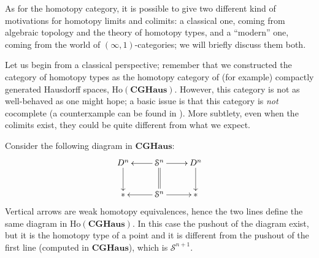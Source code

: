 \begin{refsection}
As for the homotopy category, it is possible to give two different kind of motivations for homotopy limits and colimits: a classical one, coming from algebraic topology and the theory of homotopy types, and a ``modern'' one, coming from the world of $(\infty,1)$-categories; we will briefly discuss them both.

Let us begin from a classical perspective; remember that we constructed the category of homotopy types as the homotopy category of (for example) compactly generated Hausdorff spaces, $\mathrm{Ho}(\mathbf{CGHaus})$. However, this category is not as well-behaved as one might hope; a basic issue is that this category is \emph{not} cocomplete (a counterxample can be found in \cite[Example 6.3.3]{riehl}). More subtlety, even when the colimits exist, they could be quite different from what we expect.

\begin{eg}
Consider the following diagram in $\mathbf{CGHaus}$:
\[
\xymatrix{
D^n \ar[d] & \mathcal S^n \ar[l] \ar@{=}[d] \ar[r] & D^n \ar[d] \\
{*} & \mathcal{S}^n \ar[l] \ar[r] & {*}
}
\]
Vertical arrows are weak homotopy equivalences, hence the two lines define the same diagram in $\mathrm{Ho}(\mathbf{CGHaus})$. In this case the pushout of the diagram exist, but it is the homotopy type of a point and it is different from the pushout of the first line (computed in $\mathbf{CGHaus}$), which is $\mathcal S^{n+1}$.
\end{eg}


\end{refsection}
